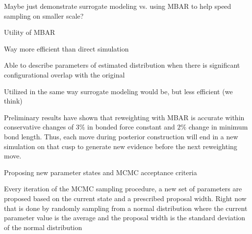 \documentclass{report}
\begin{document}
\begin{outline}
\begin{outline}
\begin{outline}
\begin{outline}
        \item{Maybe just demonstrate surrogate modeling vs. using MBAR to help speed sampling on smaller scale?}
        \item{Utility of MBAR}
        \begin{outline}
          \item{Way more efficient than direct simulation}
          \item{Able to describe parameters of estimated distribution when there is significant configurational overlap with the original}
        \end{outline}
        \item{Utilized in the same way surrogate modeling would be, but less efficient (we think)}
        \item{Preliminary results have shown that reweighting with MBAR is accurate within conservative changes of $3\%$ in bonded force constant and $2\%$
                change in minimum bond length. Thus, each move during posterior construction will end in a new simulation on that cusp to generate new 
                evidence before the next reweighting move.}
      \end{outline}
      \item{Proposing new parameter states and MCMC acceptance criteria}
      \begin{outline}
        \item{Every iteration of the MCMC sampling procedure, a new set of parameters are proposed based on the current state and a prescribed proposal width.
              Right now that is done by randomly sampling from a normal distribution where the current parameter value is the average and the proposal width is
              the standard deviation of the normal distribution}

\end{outline}
\end{outline}
\end{outline}
\end{outline}
\end{document}
